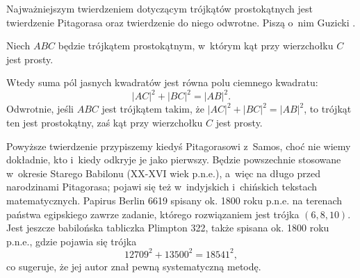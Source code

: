 %

Najważniejszym twierdzeniem dotyczącym trójkątów prostokątnych jest twierdzenie Pitagorasa oraz twierdzenie do niego odwrotne.
Piszą o~nim Guzicki \cite[s. 160]{guzicki_2021}.


\begin{theorem}[Pitagorasa]
\label{theorem_pythagorean}%
    Niech $ABC$ będzie trójkątem prostokątnym, w~którym kąt przy wierzchołku $C$ jest prosty.
    \begin{center}
\begin{comment}
        \begin{tikzpicture}[scale=.4]
        \tkzDefPoint(105:3){A}
        \tkzDefPoint(285:3){B}
        \tkzDefPoint(35:3){C}
        \tkzDefPoint(35:4.75){CC}
        \tkzMarkRightAngle[size=0.5](A,C,B)

        \tkzLabelPoint[above left](A){$A$}
        \tkzLabelPoint[below](B){$B$}
        \tkzLabelPoint[below left](CC){$C$}
        \tkzDefSquare(B,A)
        \tkzDrawPolygon[fill=black!50](B,A,tkzFirstPointResult, tkzSecondPointResult)
        \tkzDefSquare(C,B)
        \tkzDrawPolygon[fill=black!25](C,B,tkzFirstPointResult, tkzSecondPointResult)
        \tkzDefSquare(A,C)
        \tkzDrawPolygon[fill=black!25](A,C,tkzFirstPointResult, tkzSecondPointResult)
        \tkzDrawPolygon[line width=0.4mm](A,B,C)
    \end{tikzpicture}
\end{comment}
    \end{center}
    Wtedy suma pól jasnych kwadratów jest równa polu ciemnego kwadratu:
    \begin{equation}
        |AC|^2 + |BC|^2 = |AB|^2.
    \end{equation}
    Odwrotnie, jeśli $ABC$ jest trójkątem takim, że $|AC|^2 + |BC|^2 = |AB|^2$, to trójkąt ten jest prostokątny, zaś kąt przy wierzchołku $C$ jest prosty.
\end{theorem}

Powyższe twierdzenie przypiszemy kiedyś Pitagorasowi z~Samos, choć nie wiemy dokładnie, kto i~kiedy odkryje je jako pierwszy.
%
Będzie powszechnie stosowane w~okresie Starego Babilonu (XX-XVI wiek p.n.e.), a~więc na długo przed narodzinami Pitagorasa; pojawi się też w~indyjskich i~chińskich tekstach matematycznych.
Papirus Berlin 6619 spisany ok. 1800 roku p.n.e. na terenach państwa egipskiego zawrze zadanie, którego rozwiązaniem jest trójka $(6, 8, 10)$.
%
Jest jeszcze babilońska tabliczka Plimpton 322, także spisana ok. 1800 roku p.n.e., gdzie pojawia się trójka
\begin{equation}
    12709^2 + 13500^2 = 18541^2,
\end{equation}
co sugeruje, że jej autor znał pewną systematyczną metodę.
%

